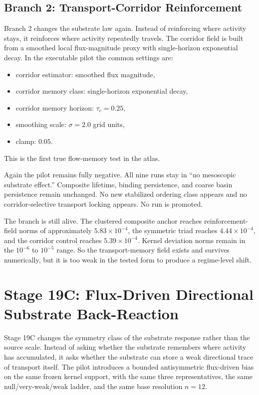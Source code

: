 \documentclass[11pt]{article}
\begin{document}
\subsection{Branch 2: Transport-Corridor Reinforcement}

Branch 2 changes the substrate law again. Instead of reinforcing where activity stays, it reinforces where activity repeatedly travels. The corridor field is built from a smoothed local flux-magnitude proxy with single-horizon exponential decay. In the executable pilot the common settings are:
\begin{itemize}
\item corridor estimator: smoothed flux magnitude,
\item corridor memory class: single-horizon exponential decay,
\item corridor memory horizon: $\tau_c=0.25$,
\item smoothing scale: $\sigma=2.0$ grid units,
\item clamp: $0.05$.
\end{itemize}
This is the first true flow-memory test in the atlas.

Again the pilot remains fully negative. All nine runs stay in ``no mesoscopic substrate effect.'' Composite lifetime, binding persistence, and coarse basin persistence remain unchanged. No new stabilized ordering class appears and no corridor-selective transport locking appears. No run is promoted.

The branch is still alive. The clustered composite anchor reaches reinforcement-field norms of approximately $5.83\times10^{-4}$, the symmetric triad reaches $4.44\times10^{-4}$, and the corridor control reaches $5.39\times10^{-4}$. Kernel deviation norms remain in the $10^{-6}$ to $10^{-5}$ range. So the transport-memory field exists and survives numerically, but it is too weak in the tested form to produce a regime-level shift.

\section{Stage 19C: Flux-Driven Directional Substrate Back-Reaction}

Stage 19C changes the symmetry class of the substrate response rather than the source scale. Instead of asking whether the substrate remembers where activity has accumulated, it asks whether the substrate can store a weak directional trace of transport itself. The pilot introduces a bounded antisymmetric flux-driven bias on the same frozen kernel support, with the same three representatives, the same null/very-weak/weak ladder, and the same base resolution $n=12$.
\end{document}
